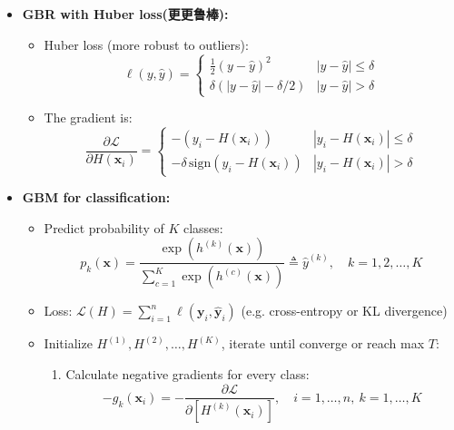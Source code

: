 \documentclass[UTF8]{ctexart}
\begin{document}
\begin{itemize}
        \begin{itemize}
            \item The gradient is $q_i = \frac{\partial \mathcal{L}}{\partial H(\mathbf{x}_i)} = -\text{sign}(y_i - H(\mathbf{x}_i))$.
            \item Then fit $h$ on $-q_i$, $i = 1, 2, \ldots, n$. (no longer the residuals, different from using the squared loss)
        \end{itemize}
    \item \textbf{GBR with Huber loss(更更鲁棒): } 
        \begin{itemize}
            \item Huber loss (more robust to outliers):
            \[
            \ell(y, \hat{y}) = \begin{cases}
                \frac{1}{2}(y - \hat{y})^2 & |y - \hat{y}| \leq \delta \\
                \delta(|y - \hat{y}| - \delta/2) & |y - \hat{y}| > \delta
            \end{cases}
            \]
            
            \item The gradient is:
            \[
            \frac{\partial \mathcal{L}}{\partial H(\mathbf{x}_i)} = \begin{cases}
                -(y_i - H(\mathbf{x}_i)) & |y_i - H(\mathbf{x}_i)| \leq \delta \\
                -\delta \, \text{sign}(y_i - H(\mathbf{x}_i)) & |y_i - H(\mathbf{x}_i)| > \delta
            \end{cases}
            \]
        \end{itemize}
    \item \textbf{GBM for classification: } 
        \begin{itemize}
            \item Predict probability of $K$ classes:
            \[p_k(\mathbf{x}) = \frac{\exp(h^{(k)}(\mathbf{x}))}{\sum_{c=1}^{K} \exp(h^{(c)}(\mathbf{x}))} \triangleq \hat{y}^{(k)}, \quad k = 1, 2, \ldots, K\]
            
            \item Loss: $\mathcal{L}(H) = \sum_{i=1}^{n} \ell(\mathbf{y}_i, \hat{\mathbf{y}}_i)$ (e.g. cross-entropy or KL divergence)
            
            \item Initialize $H^{(1)}, H^{(2)}, \ldots, H^{(K)}$, iterate until converge or reach max $T$:
            \begin{enumerate}
                \item Calculate negative gradients for every class:
                \[-g_k(\mathbf{x}_i) = -\frac{\partial \mathcal{L}}{\partial [H^{(k)}(\mathbf{x}_i)]}, \quad i = 1, \ldots, n, \ k = 1, \ldots, K\]
                

\end{enumerate}
\end{itemize}
\end{itemize}
\end{document}
